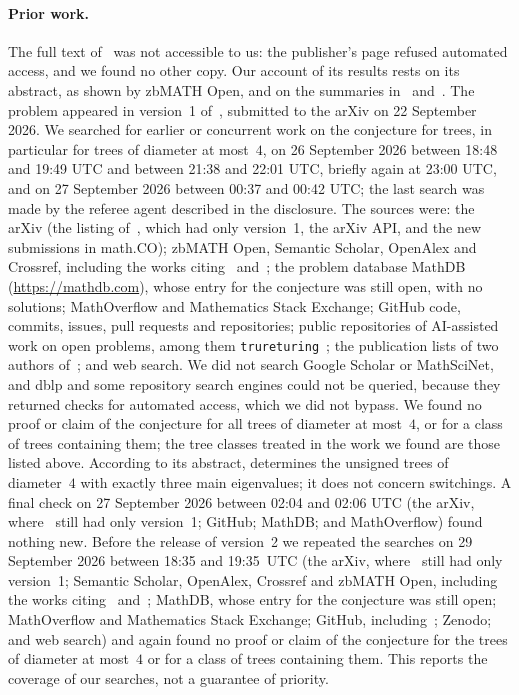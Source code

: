 \documentclass[11pt]{article}
\numberwithin{equation}{section}
\theoremstyle{remark}
\begin{document}
\paragraph{Prior work.}
The full text of~\cite{afgjl} was not accessible to us: the publisher's page
refused automated access, and we found no other copy. Our account of its
results rests on its abstract, as shown by zbMATH Open, and on the summaries
in~\cite{sy} and~\cite{akmp}. The problem
appeared in version~1 of~\cite{akmp}, submitted to the arXiv on 22 September
2026. We searched for earlier or concurrent work on the conjecture for trees,
in particular for trees of diameter at most~$4$, on 26 September 2026 between
18:48 and 19:49 UTC and between 21:38 and 22:01 UTC, briefly again at 23:00
UTC, and on 27 September 2026 between 00:37 and 00:42 UTC; the last search was
made by the referee agent described in the disclosure. The sources were: the
arXiv (the listing of~\cite{akmp}, which had only version~1, the arXiv API, and
the new submissions in math.CO); zbMATH Open, Semantic Scholar, OpenAlex and
Crossref, including the works citing~\cite{afgjl} and~\cite{sy}; the problem
database MathDB (\url{https://mathdb.com}), whose entry for the conjecture was
still open, with no solutions; MathOverflow and Mathematics Stack Exchange;
GitHub code, commits, issues, pull requests and repositories; public
repositories of AI-assisted work on open problems, among them
\texttt{trureturing}~\cite{tru}; the publication lists of two authors
of~\cite{afgjl}; and web search. We did not search Google Scholar or
MathSciNet, and dblp and some repository search engines could not be queried,
because they returned checks for automated access, which we did not bypass. We
found no proof or claim of the conjecture for all trees of diameter at
most~$4$, or for a class of trees containing them; the tree classes treated in
the work we found are those listed above. According to its abstract, \cite{fbj}
determines the unsigned trees of diameter~$4$ with exactly three main
eigenvalues; it does not concern switchings. A final check on 27 September
2026 between 02:04 and 02:06 UTC (the arXiv, where~\cite{akmp} still had only
version~1; GitHub; MathDB; and MathOverflow) found nothing new. Before the
release of version~2 we repeated the searches on 29 September 2026 between
18:35 and 19:35~UTC (the arXiv, where~\cite{akmp} still had only version~1;
Semantic Scholar, OpenAlex, Crossref and zbMATH Open, including the works
citing~\cite{akmp} and~\cite{afgjl}; MathDB, whose entry for the conjecture
was still open; MathOverflow and Mathematics Stack Exchange; GitHub,
including~\cite{tru}; Zenodo; and web search) and again found no proof or claim
of the conjecture for the trees of diameter at most~$4$ or for a class of trees
containing them. This reports the coverage of our searches, not a guarantee of
priority.
\end{document}
